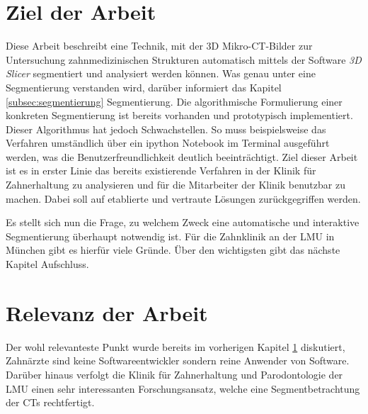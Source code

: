 \section{Ziel der Arbeit}
\label{sec:ziel_der_arbeit} Diese Arbeit beschreibt eine Technik, mit der \ac{3D}
Mikro-\ac{CT}-Bilder zur Untersuchung zahnmedizinischen Strukturen automatisch mittels
der Software \textit{3D Slicer} segmentiert und analysiert werden können. Was genau
unter eine Segmentierung verstanden wird, darüber informiert das Kapitel
\ref{subsec:segmentierung} Segmentierung. Die algorithmische Formulierung einer konkreten
Segmentierung ist bereits vorhanden und prototypisch implementiert. Dieser
Algorithmus hat jedoch Schwachstellen. So muss beispielsweise das Verfahren umständlich
über ein ipython Notebook im Terminal ausgeführt werden, was die
Benutzerfreundlichkeit deutlich beeinträchtigt. Ziel dieser Arbeit ist es in erster
Linie das bereits existierende Verfahren in der Klinik für Zahnerhaltung zu analysieren
und für die Mitarbeiter der Klinik benutzbar zu machen. Dabei soll auf
etablierte und vertraute Lösungen zurückgegriffen werden.

Es stellt sich nun die Frage, zu welchem Zweck eine automatische und interaktive
Segmentierung überhaupt notwendig ist. Für die Zahnklinik an der LMU in München
gibt es hierfür viele Gründe. Über den wichtigsten gibt das nächste Kapitel Aufschluss.

\section{Relevanz der Arbeit}
\label{sec:relevanz_der_arbeit} Der wohl relevanteste Punkt wurde bereits im vorherigen
Kapitel \ref{sec:ziel_der_arbeit} diskutiert, Zahnärzte sind keine
Softwareentwickler sondern reine Anwender von Software. Darüber hinaus verfolgt die
Klinik für Zahnerhaltung und Parodontologie der \ac{LMU} einen sehr
interessanten Forschungsansatz, welche eine Segmentbetrachtung der \ac{CT}s rechtfertigt.

